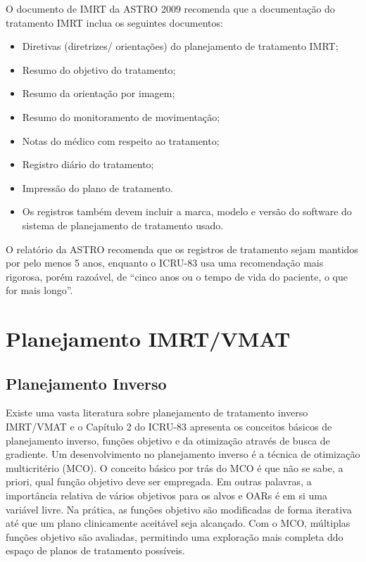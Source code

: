 \documentclass[11pt,a4paper]{article}
\begin{document}
	O documento de IMRT da ASTRO 2009 recomenda que a documentação do tratamento IMRT inclua os seguintes documentos:

	\begin{itemize}[label=\textcolor{CarnationPink}{$\star$}]
		\item Diretivas (diretrizes/ orientações) do planejamento de tratamento IMRT;
		\item Resumo do objetivo do tratamento;
		\item Resumo da orientação por imagem;
		\item Resumo do monitoramento de movimentação;
		\item Notas do médico com respeito ao tratamento;
		\item Registro diário do tratamento;
		\item Impressão do plano de tratamento.
		\item Os registros também devem incluir a marca, modelo e versão do software do sistema de planejamento de tratamento usado.
	\end{itemize}

	O relatório da ASTRO recomenda que os registros de tratamento sejam mantidos por pelo menos 5 anos, enquanto o ICRU-83 usa uma recomendação mais rigorosa, porém razoável, de “cinco anos ou o tempo de vida do paciente, o que for mais longo”.
	
\section{Planejamento IMRT/VMAT}

\subsection*{Planejamento Inverso}

	Existe uma vasta literatura sobre planejamento de tratamento inverso IMRT/VMAT e o Capítulo 2 do ICRU-83 apresenta os conceitos básicos de planejamento inverso, funções objetivo e da otimização através de busca de gradiente. Um desenvolvimento no planejamento inverso é a técnica de otimização multicritério (MCO). O conceito básico por trás do MCO é que não se sabe, a priori, qual função objetivo deve ser empregada. Em outras palavras, a importância relativa de vários objetivos para os alvos e OARs é em si uma variável livre. Na prática, as funções objetivo são modificadas de forma iterativa até que um plano clinicamente aceitável seja alcançado. Com o MCO, múltiplas funções objetivo são avaliadas, permitindo uma exploração mais completa ddo espaço de planos de tratamento possíveis. 
\end{document}
